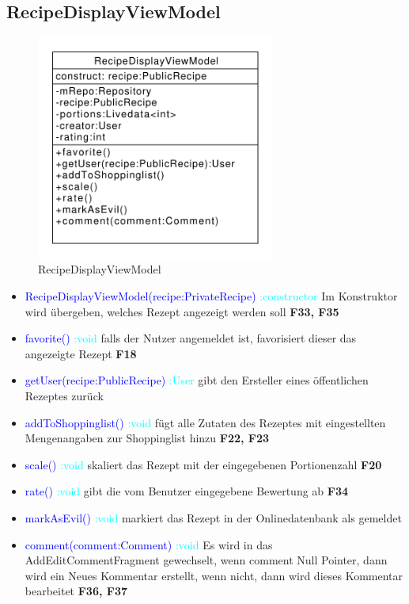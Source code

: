 \subsection{RecipeDisplayViewModel}
\begin{figure}[H]
	\centering
	\includegraphics[width=0.7\textwidth]{pics/viewModel/Recipe_Display_ViewModel.pdf}%
	\caption{RecipeDisplayViewModel}%
	\label{viewModel}%
\end{figure}
\begin{itemize}
	\item \textcolor{blue}{RecipeDisplayViewModel(recipe:PrivateRecipe)} \textcolor{cyan}{:constructor} Im Konstruktor wird übergeben, welches Rezept angezeigt werden soll \textbf{F33, F35}
	
	\item \textcolor{blue}{favorite()} \textcolor{cyan}{:void}
	falls der Nutzer angemeldet ist, favorisiert dieser das angezeigte Rezept \textbf{F18}
	
	\item \textcolor{blue}{getUser(recipe:PublicRecipe)} \textcolor{cyan}{:User}
	gibt den Ersteller eines öffentlichen Rezeptes zurück
	
	\item \textcolor{blue}{addToShoppinglist()} \textcolor{cyan}{:void}
	fügt alle Zutaten des Rezeptes mit eingestellten Mengenangaben zur Shoppinglist hinzu \textbf{F22, F23}
	
	\item \textcolor{blue}{scale()} \textcolor{cyan}{:void}
	skaliert das Rezept mit der eingegebenen Portionenzahl \textbf{F20}
	
	\item \textcolor{blue}{rate()} \textcolor{cyan}{:void}
	gibt die vom Benutzer eingegebene Bewertung ab \textbf{F34}
	
	\item \textcolor{blue}{markAsEvil()} \textcolor{cyan}{:void}
	markiert das Rezept in der Onlinedatenbank als gemeldet
	
	\item \textcolor{blue}{comment(comment:Comment)} \textcolor{cyan}{:void} Es wird in das AddEditCommentFragment gewechselt, wenn comment Null Pointer, dann wird ein Neues Kommentar erstellt, wenn nicht, dann wird dieses Kommentar bearbeitet \textbf{F36, F37}
	
\end{itemize}

